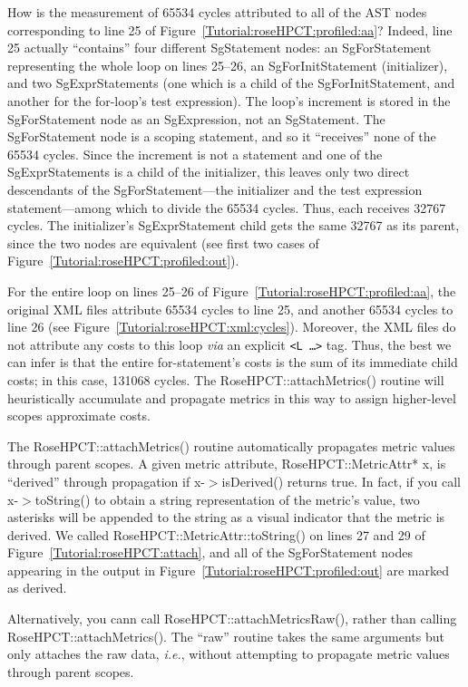 How is the measurement of 65534 cycles attributed to all of the AST
nodes corresponding to line 25 of
Figure~\ref{Tutorial:roseHPCT:profiled:aa}? Indeed, line 25 actually
``contains'' four different SgStatement nodes: an SgForStatement
representing the whole loop on lines 25--26, an SgForInitStatement
(initializer), and two SgExprStatements (one which is a child of the
SgForInitStatement, and another for the for-loop's test
expression). The loop's increment is stored in the SgForStatement node
as an SgExpression, not an SgStatement. The SgForStatement node is a
scoping statement, and so it ``receives'' none of the 65534
cycles. Since the increment is not a statement and one of the
SgExprStatements is a child of the initializer, this leaves only two
direct descendants of the SgForStatement---the initializer and the
test expression statement---among which to divide the 65534
cycles. Thus, each receives 32767 cycles. The initializer's
SgExprStatement child gets the same 32767 as its parent, since the two
nodes are equivalent (see first two cases of
Figure~\ref{Tutorial:roseHPCT:profiled:out}).

For the entire loop on lines 25--26 of
Figure~\ref{Tutorial:roseHPCT:profiled:aa}, the original XML files
attribute 65534 cycles to line 25, and another 65534 cycles to line 26
(see Figure~\ref{Tutorial:roseHPCT:xml:cycles}). Moreover, the XML
files do not attribute any costs to this loop \emph{via} an explicit
\texttt{<L \ldots>} tag. Thus, the best we can infer is that the
entire for-statement's costs is the sum of its immediate child costs;
in this case, 131068 cycles. The RoseHPCT::attachMetrics() routine
will heuristically accumulate and propagate metrics in this way to
assign higher-level scopes approximate costs.

The RoseHPCT::attachMetrics() routine automatically propagates metric
values through parent scopes. A given metric attribute,
RoseHPCT::MetricAttr* x, is ``derived'' through propagation if
x-$>$isDerived() returns true. In fact, if you call x-$>$toString() to
obtain a string representation of the metric's value, two asterisks
will be appended to the string as a visual indicator that the metric
is derived. We called RoseHPCT::MetricAttr::toString() on lines 27 and
29 of Figure~\ref{Tutorial:roseHPCT:attach}, and all of the
SgForStatement nodes appearing in the output in
Figure~\ref{Tutorial:roseHPCT:profiled:out} are marked as derived.

Alternatively, you cann call RoseHPCT::attachMetricsRaw(), rather than
calling RoseHPCT::attachMetrics().  The ``raw'' routine takes the same
arguments but only attaches the raw data, \emph{i.e.}, without
attempting to propagate metric values through parent scopes.

